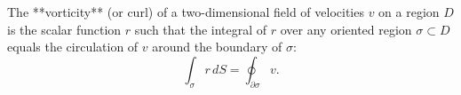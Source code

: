The **vorticity** (or curl) of a two-dimensional field of velocities $v$ on a region $D$ is the scalar function $r$ such that the integral of $r$ over any oriented region $\sigma \subset D$ equals the circulation of $v$ around the boundary of $\sigma$:
$$\int_{\sigma} r \, dS = \oint_{\partial \sigma} v.$$
